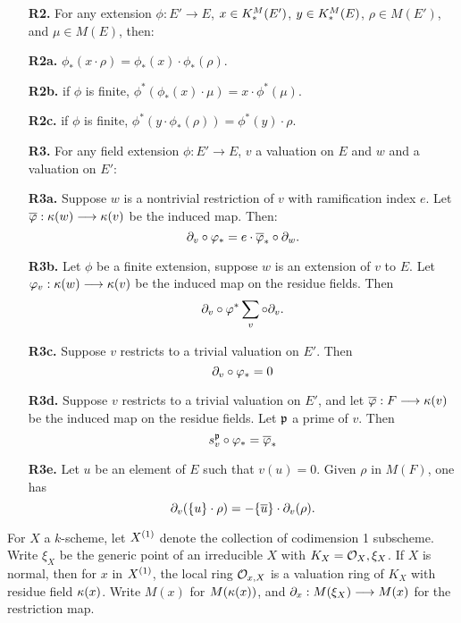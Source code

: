 \begin{defn}
\begin{enumerate}
\item[\textbf{R2.}] For any extension $\phi: E' \to E$, $x \in 
\milK_*(E')$, $y \in \milK_*(E)$, $\rho \in M(E')$, and $\mu \in 
M(E)$, then:

\item[\textbf{R2a.}] $\phi_*(x \cdot \rho) = \phi_*(x) \cdot 
\phi_*(\rho)$.

\item[\textbf{R2b.}] if $\phi$ is finite, $\phi^*(\phi_*(x) \cdot 
\mu) = x \cdot \phi^*(\mu)$.

\item[\textbf{R2c.}] if $\phi$ is finite, $\phi^*(y \cdot 
\phi_*(\rho)) = \phi^*(y) \cdot \rho$.

\item[\textbf{R3.}] For any field extension $\phi: E' \to E$, $v$ 
a valuation on $E$ and $w$ and a valuation on $E'$:

\item[\textbf{R3a.}] Suppose $w$ is a nontrivial restriction of 
$v$ with ramification index $e$. Let $\phib: \resf{w} \to 
\resf{v}$ be the induced map. Then:
\[
\res{v} \comp \phi_* = e \cdot \phib_* \comp \res{w}.
\]

\item[\textbf{R3b.}] Let $\phi$ be a finite extension, suppose
$w$ is an extension of $v$ to $E$. Let $\phi_v: \resf{w} \to 
\resf{v}$ be the induced map on the residue fields. Then
\[
\res{v} \comp \phi^* \sum_{v} \comp \res{v}.
\]

\item[\textbf{R3c.}] Suppose $v$ restricts to a trivial valuation 
on $E'$. Then
\[
\res{v} \comp \phi_* = 0
\]

\item[\textbf{R3d.}] Suppose $v$ restricts to a trivial valuation 
on $E'$, and let $\phib: F \to \resf{v}$ be the induced map on 
the residue fields. Let $\ideal{p}$ a prime of $v$. Then
\[
\Special{v}{\ideal{p}} \comp \phi_* = \phib_*
\]

\item[\textbf{R3e.}] Let $u$ be an element of $E$ such that 
$v(u) = 0$. Given $\rho$ in $M(F)$, one has
\[
\res{v}(\{u\} \cdot \rho) = -\{\overline{u}\} \cdot \res{v}(\rho).
\]
\end{enumerate}
\end{defn}

For $X$ a $k$-scheme, let $\subsch{1}{X}$ denote the collection of 
codimension 1 subscheme. Write $\xi_X$ be the generic point of an
irreducible $X$ with $K_X = \O_X,\xi_X$. If $X$ is normal, then 
for $x$ in $\subsch{1}{X}$, the local ring $\O_{x,X}$ is a valuation 
ring of $K_X$ with residue field $\resf{x}$. Write $M(x)$ for 
$M(\resf{x})$, and $\res{x}: M(\xi_X) \to M(x)$ for the 
restriction map.

